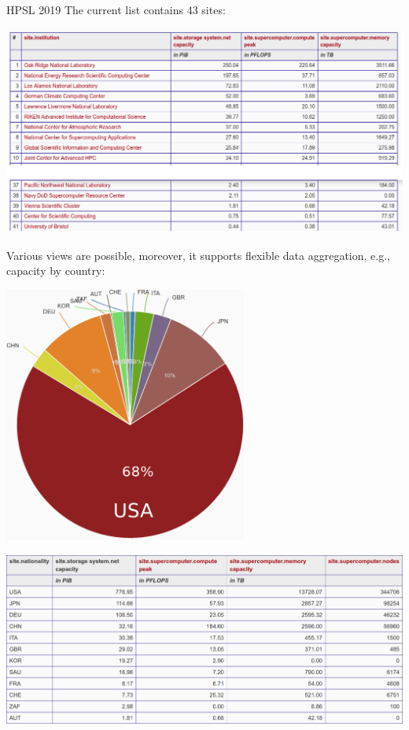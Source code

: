 \documentclass[portrait,a0paper,fontscale=0.4]{baposter}
\begin{document}
\begin{poster}
\begin{posterbox}[name=engineering,column=3]{HPSL 2019}
The current list contains 43 sites:

\includegraphics[width=\textwidth]{dcl-2018}

Various views are possible, moreover, it
supports flexible data aggregation, e.g., capacity by country:

\vspace*{-2em}

\begin{center}
\includegraphics[width=0.6\textwidth]{aggregated-by-country}
\end{center}

\vspace*{-1em}

\includegraphics[width=\textwidth]{capacity-grouped}


\end{posterbox}
\end{poster}
\end{document}
